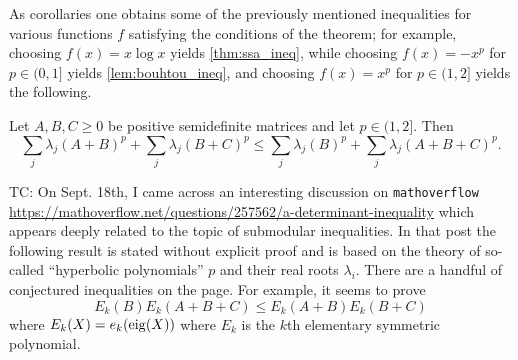 \documentclass[notitlepage, 10pt]{article}
\begin{document}
As corollaries one obtains some of the previously mentioned inequalities for various functions $f$ satisfying the conditions of the theorem; for example, choosing $f(x) = x \log x$ yields \cref{thm:ssa_ineq}, while choosing $f(x) = -x^p$ for $p\in(0,1]$ yields \cref{lem:bouhtou_ineq}, and choosing $f(x) = x^p$ for $p \in (1, 2]$ yields the following.

\begin{cor}
    Let $A,B,C \geq 0$ be positive semidefinite matrices and let $p \in (1,2]$.
    Then
    \begin{equation}
        \sum_{j}\lambda_j(A+B)^p + \sum_{j}\lambda_j(B+C)^p \leq \sum_{j}\lambda_j(B)^p + \sum_{j}\lambda_j(A+B+C)^p.
    \end{equation}
\end{cor}

{\color{blue}
TC: On Sept. 18th, I came across an interesting discussion on \texttt{mathoverflow} \url{https://mathoverflow.net/questions/257562/a-determinant-inequality} which appears deeply related to the topic of submodular inequalities. In that post the following result is stated without explicit proof and is based on the theory of so-called ``hyperbolic polynomials'' $p$ and their real roots $\lambda_i$. There are a handful of conjectured inequalities on the page.
For example, it seems to prove
\begin{equation}
    E_k(B)E_k(A+B+C) \leq E_k(A+B) E_k(B+C)
\end{equation}
where $E_k(X) = e_{k}(\operatorname{eig}(X))$ where $E_k$ is the $k$th elementary symmetric polynomial.
}
\end{document}
